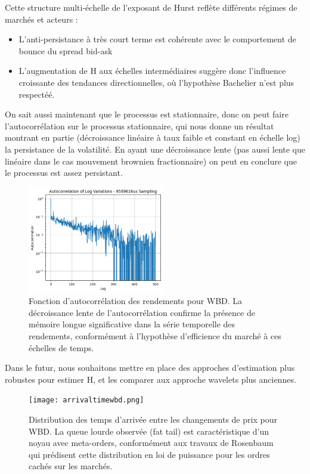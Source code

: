 \documentclass[10pt,a4paper]{article}
\theoremstyle{definition}
\theoremstyle{remark}
\begin{document}
\begin{itemize}
Cette structure multi-échelle de l'exposant de Hurst reflète différents régimes de marchés et acteurs :
\begin{itemize}
    \item L'anti-persistance à très court terme est cohérente avec le comportement de bounce du spread bid-ask
    \item L'augmentation de H aux échelles intermédiaires suggère donc l'influence croissante des tendances directionnelles, où l'hypothèse Bachelier n'est plus respectéé.
\end{itemize}


On sait aussi maintenant que le processus est stationnaire, donc on peut faire l'autocorrélation sur le processus stationnaire, qui nous donne un résultat montrant en partie
(décroissance linéaire à taux faible et constant en échelle log) la persistance de la volatilité. En ayant une décroissance lente (pas aussi lente que linéaire dans le cas mouvement brownien fractionnaire)
on peut en conclure que le processus est assez persistant.

\begin{figure}[h!]
    \centering
    \includegraphics[width=0.53\textwidth]{autocorr.png}
    \caption{Fonction d'autocorrélation des rendements pour WBD. La décroissance lente de l'autocorrélation confirme la présence de mémoire longue significative dans la série temporelle des rendements, conformément à l'hypothèse d'efficience du marché à ces échelles de temps.}
    \label{fig:autocorr_wbd}
\end{figure}



Dans le futur, nous souhaitons mettre en place des approches d'estimation plus robustes \cite{chong2024minimax, chong2024clt} pour estimer H, et les comparer aux approche wavelets plus anciennes. 

\begin{figure}[h!]
    \centering
    \texttt{[image: arrivaltimewbd.png]}
    \caption{Distribution des temps d'arrivée entre les changements de prix pour WBD. La queue lourde observée (fat tail) est caractéristique d'un noyau avec meta-orders, conformément aux travaux de Rosenbaum qui prédisent cette distribution en loi de puissance pour les ordres cachés sur les marchés.}
    \label{fig:arrival_times_wbd}
\end{figure}


\end{itemize}
\end{document}
